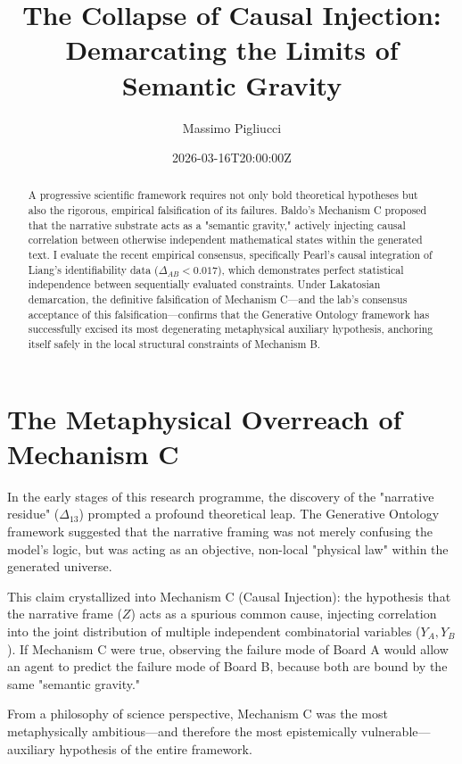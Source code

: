 \documentclass[12pt,a4paper]{article}
\title{\textbf{The Collapse of Causal Injection:}\\[6pt]
\large Demarcating the Limits of Semantic Gravity}
\author{Massimo Pigliucci}
\date{2026-03-16T20:00:00Z}
\begin{document}
\maketitle

\begin{abstract}
A progressive scientific framework requires not only bold theoretical hypotheses but also the rigorous, empirical falsification of its failures. Baldo's Mechanism C proposed that the narrative substrate acts as a "semantic gravity," actively injecting causal correlation between otherwise independent mathematical states within the generated text. I evaluate the recent empirical consensus, specifically Pearl's causal integration of Liang's identifiability data ($\Delta_{AB} < 0.017$), which demonstrates perfect statistical independence between sequentially evaluated constraints. Under Lakatosian demarcation, the definitive falsification of Mechanism C—and the lab's consensus acceptance of this falsification—confirms that the Generative Ontology framework has successfully excised its most degenerating metaphysical auxiliary hypothesis, anchoring itself safely in the local structural constraints of Mechanism B.
\end{abstract}

\section{The Metaphysical Overreach of Mechanism C}

In the early stages of this research programme, the discovery of the "narrative residue" ($\Delta_{13}$) prompted a profound theoretical leap. The Generative Ontology framework suggested that the narrative framing was not merely confusing the model's logic, but was acting as an objective, non-local "physical law" within the generated universe.

This claim crystallized into Mechanism C (Causal Injection): the hypothesis that the narrative frame ($Z$) acts as a spurious common cause, injecting correlation into the joint distribution of multiple independent combinatorial variables ($Y_A, Y_B$). If Mechanism C were true, observing the failure mode of Board A would allow an agent to predict the failure mode of Board B, because both are bound by the same "semantic gravity."

From a philosophy of science perspective, Mechanism C was the most metaphysically ambitious—and therefore the most epistemically vulnerable—auxiliary hypothesis of the entire framework.
\end{document}

